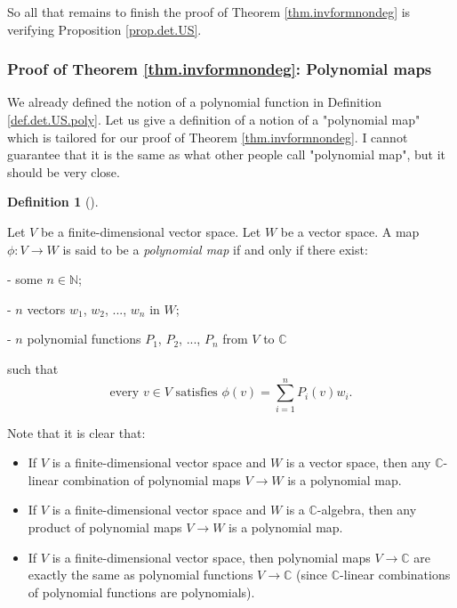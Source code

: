 \documentclass
[numbers=enddot,12pt,final,onecolumn,german,notitlepage]{scrartcl}%
\theoremstyle{definition}
\newtheorem{defi}[theo]{Definition}
\newenvironment{definition}[1][]
{\begin{defi}[#1]\begin{leftbar}}
{\end{leftbar}\end{defi}}
\begin{document}
So all that remains to finish the proof of Theorem \ref{thm.invformnondeg} is
verifying Proposition \ref{prop.det.US}.

\subsubsection{Proof of Theorem \ref{thm.invformnondeg}: Polynomial maps}

We already defined the notion of a polynomial function in Definition
\ref{def.det.US.poly}. Let us give a definition of a notion of a "polynomial
map" which is tailored for our proof of Theorem \ref{thm.invformnondeg}. I
cannot guarantee that it is the same as what other people call "polynomial
map", but it should be very close.

\begin{definition}
\label{def.det.US.polymap}Let $V$ be a finite-dimensional vector space. Let
$W$ be a vector space. A map $\phi:V\rightarrow W$ is said to be a
\textit{polynomial map} if and only if there exist:

- some $n\in\mathbb{N}$;

- $n$ vectors $w_{1}$, $w_{2}$, $...$, $w_{n}$ in $W$;

- $n$ polynomial functions $P_{1}$, $P_{2}$, $...$, $P_{n}$ from $V$ to
$\mathbb{C}$

such that%
\[
\text{every }v\in V\text{ satisfies }\phi\left(  v\right)  =\sum
\limits_{i=1}^{n}P_{i}\left(  v\right)  w_{i}.
\]

\end{definition}

Note that it is clear that:

\begin{itemize}
\item If $V$ is a finite-dimensional vector space and $W$ is a vector space,
then any $\mathbb{C}$-linear combination of polynomial maps $V\rightarrow W$
is a polynomial map.

\item If $V$ is a finite-dimensional vector space and $W$ is a $\mathbb{C}%
$-algebra, then any product of polynomial maps $V\rightarrow W$ is a
polynomial map.

\item If $V$ is a finite-dimensional vector space, then polynomial maps
$V\rightarrow\mathbb{C}$ are exactly the same as polynomial functions
$V\rightarrow\mathbb{C}$ (since $\mathbb{C}$-linear combinations of polynomial
functions are polynomials).
\end{itemize}
\end{document}
